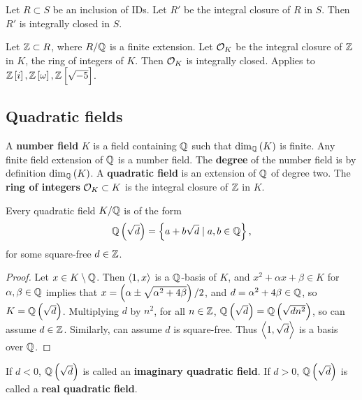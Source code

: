 \begin{theorem}
Let $ R \subset S $ be an inclusion of IDs. Let $ R' $ be the integral closure of $ R $ in $ S $. Then $ R' $ is integrally closed in $ S $.
\end{theorem}

\begin{example*}
Let $ \mathbb{Z} \subset R $, where $ R / \mathbb{Q} $ is a finite extension. Let $ \mathcal{O}_K $ be the integral closure of $ \mathbb{Z} $ in $ K $, the ring of integers of $ K $. Then $ \mathcal{O}_K $ is integrally closed. Applies to $ \Z\sbr{i}, \Z\sbr{\omega}, \Z\sbr{\sqrt{-5}} $.
\end{example*}

\pagebreak

\subsection{Quadratic fields}

A \textbf{number field} $ K $ is a field containing $ \mathbb{Q} $ such that $ \dim_\Q\br{K} $ is finite. Any finite field extension of $ \mathbb{Q} $ is a number field. The \textbf{degree} of the number field is by definition $ \dim_\Q\br{K} $. A \textbf{quadratic field} is an extension of $ \mathbb{Q} $ of degree two. The \textbf{ring of integers} $ \mathcal{O}_K \subset K $ is the integral closure of $ \mathbb{Z} $ in $ K $.

\begin{lemma}
Every quadratic field $ K / \mathbb{Q} $ is of the form
$$ \Q\br{\sqrt{d}} = \cbr{a + b\sqrt{d} \mid a, b \in \Q}, $$
for some square-free $ d \in \mathbb{Z} $.
\end{lemma}

\begin{proof}
Let $ x \in K \setminus \mathbb{Q} $. Then $ \left\langle 1, x \right\rangle $ is a $ \mathbb{Q} $-basis of $ K $, and $ x^2 + \alpha x + \beta \in K $ for $ \alpha, \beta \in \mathbb{Q} $ implies that $ x = \br{\alpha \pm\sqrt{\alpha^2 + 4\beta}} / 2 $, and $ d = \alpha^2 + 4\beta \in \mathbb{Q} $, so $ K = \Q\br{\sqrt{d}} $. Multiplying $ d $ by $ n^2 $, for all $ n \in \mathbb{Z} $, $ \Q\br{\sqrt{d}} = \Q\br{\sqrt{dn^2}} $, so can assume $ d \in \mathbb{Z} $. Similarly, can assume $ d $ is square-free. Thus $ \left\langle 1, \sqrt{d} \right\rangle $ is a basis over $ \mathbb{Q} $.
\end{proof}

\begin{remark*}
If $ d < 0 $, $ \Q\br{\sqrt{d}} $ is called an \textbf{imaginary quadratic field}. If $ d > 0 $, $ \Q\br{\sqrt{d}} $ is called a \textbf{real quadratic field}.
\end{remark*}

